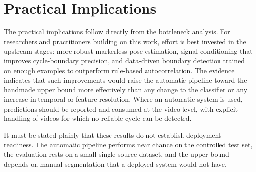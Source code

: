 \section{Practical Implications}
\label{sec:disc-practical}

The practical implications follow directly from the bottleneck analysis. For
researchers and practitioners building on this work, effort is best invested in
the upstream stages: more robust markerless pose estimation, signal conditioning
that improves cycle-boundary precision, and data-driven boundary detection
trained on enough examples to outperform rule-based autocorrelation. The
evidence indicates that such improvements would raise the automatic pipeline
toward the handmade upper bound more effectively than any change to the
classifier or any increase in temporal or feature resolution. Where an
automatic system is used, predictions should be reported and consumed at the
video level, with explicit handling of videos for which no reliable cycle can
be detected.

It must be stated plainly that these results do not establish deployment
readiness. The automatic pipeline performs near chance on the controlled test
set, the evaluation rests on a small single-source dataset, and the upper bound
depends on manual segmentation that a deployed system would not have. 


